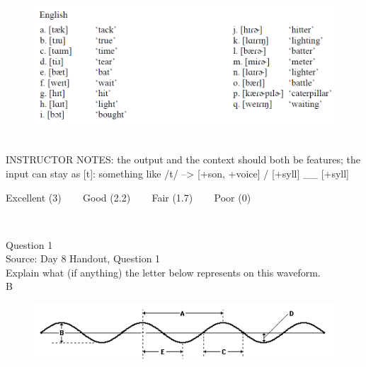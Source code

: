 \documentclass[12pt]{article}
\begin{document}
\begin{figure}[H]
\includegraphics{../images/english_t_flap.png}
\end{figure}

~\\
INSTRUCTOR NOTES: the output and the context should both be features; the input can stay as [t]: something like /t/ --> [+son, +voice] / [+syll] \_\_ [+syll]


\vfill
Excellent (3) ~~~ Good (2.2) ~~~ Fair (1.7) ~~~ Poor (0)
\newpage

\begin{center}
\textbf{{\color{red}{\HUGE END OF EXAM}}}\\

\end{center}
\newpage

\begin{center}
\textbf{{\color{blue}{\HUGE START OF EXAM\\}}}

\textbf{{\color{blue}{\HUGE Student ID: 7661\\}}}

\textbf{{\color{blue}{\HUGE 12:50 - 1:10 PM\\}}}

\end{center}
\newpage

{\large Question 1}\\

Source: Day 8 Handout, Question 1\\

Explain what (if anything) the letter below represents on this waveform.\\

B

\begin{figure}[H]
\includegraphics{../images/sinusoid.png}
\end{figure}
\end{document}
